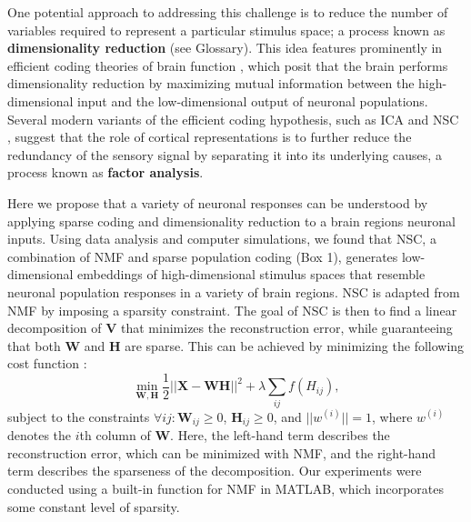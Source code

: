One potential approach to addressing this challenge is to reduce the number
of variables required to represent a particular stimulus space;
a process known as \textbf{dimensionality reduction} (see Glossary).
This idea features prominently in 
efficient coding theories of brain function
\citep{Barlow1961,Barlow2001,Atick1992,Linsker1990},
which posit that the brain performs dimensionality reduction 
by maximizing mutual information between the
high-dimensional input and the low-dimensional output 
of neuronal populations.
Several modern variants of the efficient coding hypothesis,
such as \ac{ICA} \citep{BellSejnowski1997}
and \acf{NSC} \citep{Hoyer2002,Hoyer2004}, suggest that the role of cortical representations is to
further reduce the redundancy of the sensory signal 
by separating it into its underlying causes,
a process known as \textbf{factor analysis}.

Here we propose that a variety of neuronal responses
can be understood by applying sparse coding and dimensionality reduction to a brain regions neuronal inputs.
Using data analysis and computer simulations,
we found that \ac{NSC},
a combination of \acf{NMF} \citep{PaateroTapper1994,LeeSeung1999}
and sparse population coding \citep{Field1994} (Box 1),
generates low-dimensional embeddings of 
high-dimensional stimulus spaces 
that resemble neuronal population responses 
in a variety of brain regions. 
\ac{NSC} is adapted from NMF by imposing a sparsity constraint. The goal of \ac{NSC} is then to find a linear decomposition of \textbf{V}
that minimizes the reconstruction error,
while guaranteeing that both \textbf{W} and \textbf{H} are sparse.
This can be achieved by minimizing the following cost function
\citep{Hoyer2002}:
\begin{equation}
\min_{\mathbf{W}, \mathbf{H}} \frac{1}{2} ||\mathbf{X} -\mathbf{WH}||^2 + \lambda \sum_{ij} f(H_{ij}),
\end{equation}
subject to the constraints
$\forall ij: \mathbf{W}_{ij} \geq 0$, $\mathbf{H}_{ij} \geq 0$, and
$||w^{(i)}|| = 1$, where $w^{(i)}$ denotes the $i$th column of \textbf{W}.
Here, the left-hand term describes the reconstruction error, which can
be minimized with \ac{NMF},
and the right-hand term describes the sparseness of the decomposition. Our experiments were conducted using a built-in function for \ac{NMF} in MATLAB, which incorporates some constant level of sparsity.

